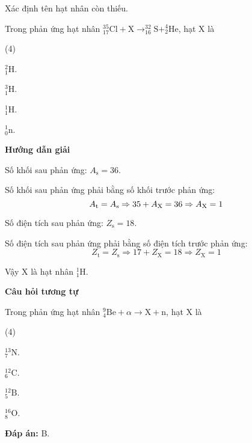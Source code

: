 \begin{dang}{Xác định tên hạt nhân còn thiếu.}
{
Trong phản ứng hạt nhân $^{35}_{17} \text{Cl} + \text{X} \longrightarrow ^{32}_{16} \text{S} + ^{4}_{2} \text{He}$, hạt X là
		\begin{mcq}(4)
			\item $^{2}_{1} \text{H}$.
			\item $^{3}_{1} \text{H}$. 
			\item $^{1}_{1} \text{H}$. 
			\item $^{1}_{0} \text{n}$.
		\end{mcq}
}
{
\begin{center}
	\textbf{Hướng dẫn giải}
\end{center}

Số khối sau phản ứng: $A_\text{s} = 36$.
		
		Số khối sau phản ứng phải bằng số khối trước phản ứng:
		$$A_\text{t} = A_\text{s} \Rightarrow 35+A_\text X = 36 \Rightarrow A_\text X = 1$$
		
		Số điện tích sau phản ứng: $Z_\text{s} = 18$.
		
		Số điện tích sau phản ứng phải bằng số điện tích trước phản ứng:
		$$Z_\text{t} = Z_\text{s} \Rightarrow 17 + Z_\text{X} = 18 \Rightarrow Z_\text{X} = 1$$
		
		Vậy X là hạt nhân $^{1}_{1} \text{H}$.

\begin{center}
	\textbf{Câu hỏi tương tự}
\end{center}

Trong phản ứng hạt nhân $^{9}_{4} \text{Be} + \alpha \longrightarrow \text{X} + \text{n}$, hạt X là
		\begin{mcq}(4)
			\item $^{13}_{7} \text{N}$.
			\item $^{12}_{6} \text{C}$.
			\item $^{12}_{5} \text{B}$. 
			\item $^{16}_{8} \text{O}$.
		\end{mcq}
\textbf{Đáp án:} B.
}

\end{dang}



